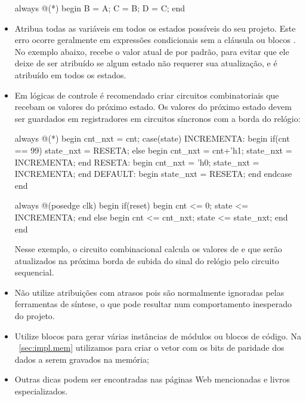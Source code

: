 \begin{itemize}
\begin{verilogcode}
always @(*) begin
    B = A;
    C = B;
    D = C;
end
\end{verilogcode}

\item Atribua todas as variáveis em todos os estados possíveis do seu
projeto. Este erro ocorre geralmente em expressões condicionais 
sem a cláusula  ou blocos . No exemplo abaixo,
 recebe o valor atual de  por padrão, para evitar
que ele deixe de ser atribuído se algum estado não requerer sua
atualização, e  é atribuído em todos os estados. 

\item Em lógicas de controle é recomendado criar circuitos
combinatoriais que recebam os valores do próximo estado. Os valores do
próximo estado devem ser guardados em registradores em circuitos
síncronos com a borda do relógio:

\begin{verilogcode}
always @(*) begin
    cnt_nxt = cnt;  
    case(state)
        INCREMENTA: begin 
            if(cnt == 99)
                state_nxt = RESETA;
            else begin
                cnt_nxt = cnt+'h1;
                state_nxt = INCREMENTA;
        end    
        RESETA: begin 
            cnt_nxt = 'h0;
            state_nxt = INCREMENTA;
        end
        DEFAULT: begin
            state_nxt = RESETA;
        end
    endcase
end

always @(posedge clk) begin
    if(reset) begin
        cnt <= 0;
        state <= INCREMENTA;
    end
    else begin
        cnt <= cnt_nxt;
        state <= state_nxt;
    end
end
\end{verilogcode}

Nesse exemplo, o circuito combinacional calcula os valores de
 e  que serão atualizados na próxima borda de subida
do sinal do relógio pelo circuito sequencial.

\item Não utilize atribuições com atrasos pois são normalmente ignoradas
pelas ferramentas de síntese, o que pode resultar num comportamento
inesperado do projeto.


\item Utilize blocos  para gerar várias instâncias de
módulos ou blocos de código. Na \secstr~\ref{sec:impl.mem} utilizamos
 para criar o vetor com os bits de paridade dos dados a
serem gravados na memória;

\item Outras dicas podem ser encontradas nas páginas Web mencionadas e
livros especializados.

\end{itemize}





